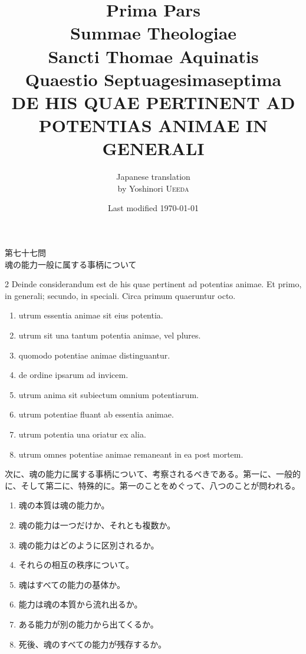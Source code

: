 \documentclass[paper=a4paper,fontsize=10pt,jafontsize=9pt,titlepage]{jlreq}
\title{{\bfseries Prima Pars}\\{\Huge Summae Theologiae}\\Sancti Thomae Aquinatis\\{\sffamily Quaestio Septuagesimaseptima}\\{\bfseries DE HIS QUAE PERTINENT AD POTENTIAS ANIMAE IN GENERALI}}
\author{Japanese translation\\by Yoshinori {\scshape Ueeda}}
\date{Last modified \today}
\begin{document}
\maketitle
\tableofcontents
\newpage
\begin{center}
 {\Large 第七十七問\\魂の能力一般に属する事柄について}
\end{center}
\vspace{2em}
\begin{paracol}{2}
 Deinde considerandum est de his quae pertinent ad potentias animae. Et primo, in generali; secundo, in speciali. Circa primum quaeruntur octo.

 \begin{enumerate}
  \item utrum essentia animae sit eius potentia.
  \item utrum sit una tantum potentia animae, vel plures.
  \item quomodo potentiae animae distinguantur.
  \item de ordine ipsarum ad invicem.
  \item utrum anima sit subiectum omnium potentiarum.
  \item utrum potentiae fluant ab essentia animae.
  \item utrum potentia una oriatur ex alia.
  \item utrum omnes potentiae animae remaneant in ea post mortem.
 \end{enumerate}

 \switchcolumn

次に、魂の能力に属する事柄について、考察されるべきである。第一に、一般的に、そして第二に、特殊的に。第一のことをめぐって、八つのことが問われる。
 
 \begin{enumerate}
  \item 魂の本質は魂の能力か。
  \item 魂の能力は一つだけか、それとも複数か。
  \item 魂の能力はどのように区別されるか。
  \item それらの相互の秩序について。
  \item 魂はすべての能力の基体か。
  \item 能力は魂の本質から流れ出るか。
  \item ある能力が別の能力から出てくるか。
  \item 死後、魂のすべての能力が残存するか。
 \end{enumerate}

\end{paracol}
\newpage 
\end{document}
